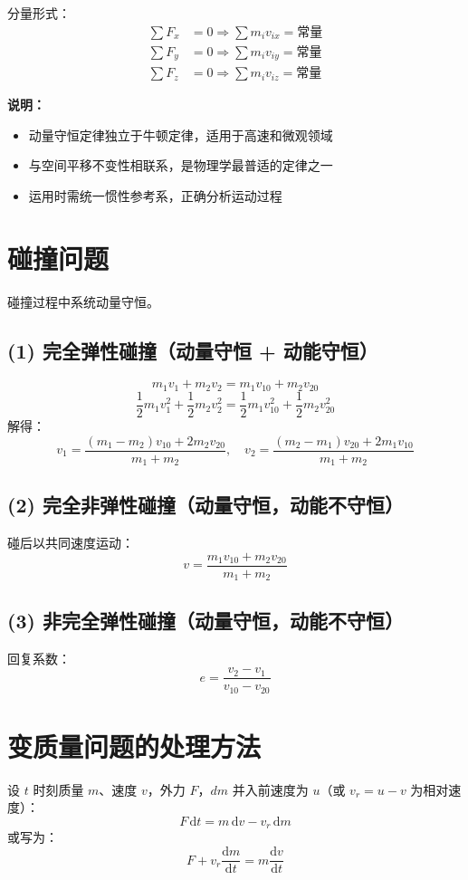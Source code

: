 \documentclass{ctexart}
\begin{document}
分量形式：
\begin{align*}
\sum F_x &= 0 \Rightarrow \sum m_i v_{ix} = \text{常量} \\
\sum F_y &= 0 \Rightarrow \sum m_i v_{iy} = \text{常量} \\
\sum F_z &= 0 \Rightarrow \sum m_i v_{iz} = \text{常量}
\end{align*}

\textbf{说明：}
\begin{itemize}
  \item 动量守恒定律独立于牛顿定律，适用于高速和微观领域
  \item 与空间平移不变性相联系，是物理学最普适的定律之一
  \item 运用时需统一惯性参考系，正确分析运动过程
\end{itemize}

\section*{碰撞问题}
碰撞过程中系统动量守恒。

\subsection*{(1) 完全弹性碰撞（动量守恒 + 动能守恒）}
\[
m_1 v_1 + m_2 v_2 = m_1 v_{10} + m_2 v_{20}
\]
\[
\frac12 m_1 v_1^{2} + \frac12 m_2 v_2^{2} = \frac12 m_1 v_{10}^{2} + \frac12 m_2 v_{20}^{2}
\]
解得：
\[
v_1 = \frac{(m_1 - m_2)v_{10} + 2m_2 v_{20}}{m_1 + m_2},\quad
v_2 = \frac{(m_2 - m_1)v_{20} + 2m_1 v_{10}}{m_1 + m_2}
\]

\subsection*{(2) 完全非弹性碰撞（动量守恒，动能不守恒）}
碰后以共同速度运动：
\[
v = \frac{m_1 v_{10} + m_2 v_{20}}{m_1 + m_2}
\]

\subsection*{(3) 非完全弹性碰撞（动量守恒，动能不守恒）}
回复系数：
\[
e = \frac{v_2 - v_1}{v_{10} - v_{20}}
\]

\section*{变质量问题的处理方法}
设 $t$ 时刻质量 $m$、速度 $v$，外力 $F$，$dm$ 并入前速度为 $u$（或 $v_r = u - v$ 为相对速度）：
\[
F\,\mathrm{d}t = m\,\mathrm{d}v - v_r\,\mathrm{d}m
\]
或写为：
\[
F + v_r\frac{\mathrm{d}m}{\mathrm{d}t} = m\frac{\mathrm{d}v}{\mathrm{d}t}
\]
\end{document}
